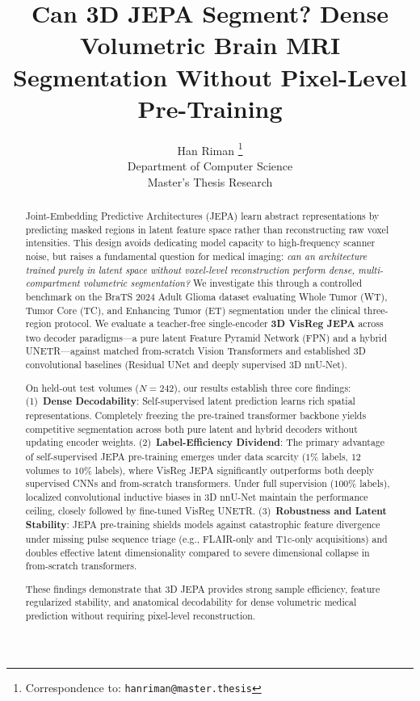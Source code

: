 \documentclass{article}
\title{Can 3D JEPA Segment? Dense Volumetric Brain MRI Segmentation Without Pixel-Level Pre-Training}
\author{%
  Han Riman \thanks{Correspondence to: \texttt{hanriman@master.thesis}} \\
  Department of Computer Science \\
  Master's Thesis Research \\
}
\begin{document}
\maketitle

\begin{abstract}
Joint-Embedding Predictive Architectures (JEPA) learn abstract representations by predicting masked regions in latent feature space rather than reconstructing raw voxel intensities. This design avoids dedicating model capacity to high-frequency scanner noise, but raises a fundamental question for medical imaging: \emph{can an architecture trained purely in latent space without voxel-level reconstruction perform dense, multi-compartment volumetric segmentation?} We investigate this through a controlled benchmark on the BraTS 2024 Adult Glioma dataset evaluating Whole Tumor (WT), Tumor Core (TC), and Enhancing Tumor (ET) segmentation under the clinical three-region protocol. We evaluate a teacher-free single-encoder \textbf{3D VisReg JEPA} across two decoder paradigms---a pure latent Feature Pyramid Network (FPN) and a hybrid UNETR---against matched from-scratch Vision Transformers and established 3D convolutional baselines (Residual UNet and deeply supervised 3D nnU-Net).

On held-out test volumes ($N=242$), our results establish three core findings:
(1)~\textbf{Dense Decodability}: Self-supervised latent prediction learns rich spatial representations. Completely freezing the pre-trained transformer backbone yields competitive segmentation across both pure latent and hybrid decoders without updating encoder weights.
(2)~\textbf{Label-Efficiency Dividend}: The primary advantage of self-supervised JEPA pre-training emerges under data scarcity ($1\%$ labels, $12$ volumes to $10\%$ labels), where VisReg JEPA significantly outperforms both deeply supervised CNNs and from-scratch transformers. Under full supervision ($100\%$ labels), localized convolutional inductive biases in 3D nnU-Net maintain the performance ceiling, closely followed by fine-tuned VisReg UNETR.
(3)~\textbf{Robustness and Latent Stability}: JEPA pre-training shields models against catastrophic feature divergence under missing pulse sequence triage (e.g., FLAIR-only and T1c-only acquisitions) and doubles effective latent dimensionality compared to severe dimensional collapse in from-scratch transformers.

These findings demonstrate that 3D JEPA provides strong sample efficiency, feature regularized stability, and anatomical decodability for dense volumetric medical prediction without requiring pixel-level reconstruction.
\end{abstract}
\end{document}
